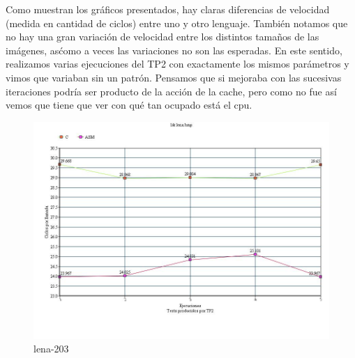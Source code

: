 Como muestran los gr\'aficos presentados, hay claras diferencias de velocidad (medida en cantidad de ciclos) entre uno y otro lenguaje. Tambi\'en notamos que no hay una gran 
variaci\'on de velocidad entre los distintos tamaños de las im\'agenes, as\' como a veces las variaciones no son las esperadas. En este sentido, realizamos varias ejecuciones
 del TP2 con exactamente los mismos par\'ametros y vimos que variaban sin un patr\'on. Pensamos que si mejoraba con las sucesivas iteraciones podr\'ia ser 
 producto de la acci\'on de la cache, pero como no fue as\'i vemos que tiene que ver con qu\'e tan ocupado est\'a el cpu.
\begin{figure}
  \begin{center}
	\includegraphics[scale=0.66]{imagenes/ldr-lena-203.jpg}
	\caption{lena-203}
	\label{lena-203}
  \end{center}
\end{figure}
